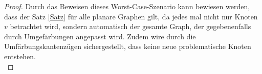\begin{proof}
Durch das Beweisen dieses Worst-Case-Szenario kann bewiesen werden, dass der Satz \ref{Satz} für alle planare Graphen gilt, da jedes mal nicht nur Knoten $v$ betrachtet wird, sondern automatisch der gesamte Graph, der gegebenenfalls durch Umgefärbungen angepasst wird. Zudem wire durch die Umfärbungskantenzügen sichergestellt, dass keine neue problematische Knoten entstehen.\\

\end{proof}
